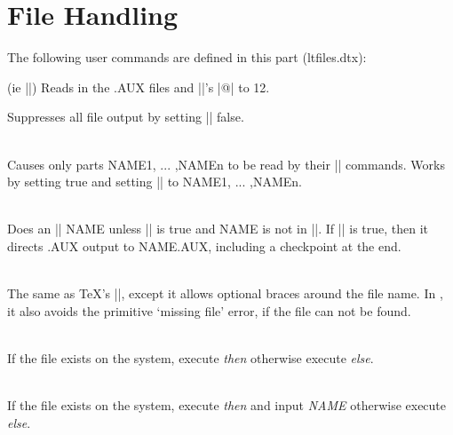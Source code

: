 
 \chapter{File Handling}

 The following user commands are defined in this part (ltfiles.dtx):

  \begin{macro}{\document} (ie ||)
      Reads in the .AUX files and |\catcode|'s |@| to 12.
  \end{macro}

  \begin{macro}{\nofiles}
       Suppresses all file output by setting |\@filesw| false.
  \end{macro}

  \begin{macro}{}\\
       Causes only parts NAME1, ... ,NAMEn to be read by
         their || commands.  Works by setting \@partsw true
         and setting |\@partlist| to NAME1, ... ,NAMEn.
  \end{macro}

  \begin{macro}{}\\
        Does an || NAME unless |\@partsw| is true and
         NAME is not in |\@partlist|.  If |\@filesw| is true, then
         it directs .AUX output to NAME.AUX, including a
         checkpoint at the end.
  \end{macro}

 \begin{macro}{}\\
        The same as TeX's ||, except it allows optional
         braces around the file name. In \LaTeXe, it also avoids
         the primitive `missing file' error, if the file can not be
         found.
 \end{macro}

 \begin{macro}{\IfFileExists}\\
   If the file exists on the system, execute \emph{then} otherwise
   execute \emph{else}.
 \end{macro}

 \begin{macro}{\InputIfFileExists}\\
   If the file exists on the system, execute \emph{then} and input
   \emph{NAME}  otherwise execute \emph{else}.
 \end{macro}


